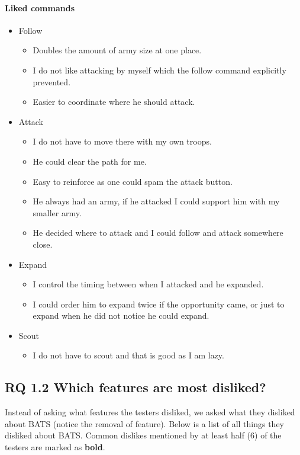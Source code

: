 \paragraph{Liked commands}
\begin{itemize}
	\item Follow
	\begin{itemize}
		\item Doubles the amount of army size at one place.
		\item I do not like attacking by myself which the follow command explicitly prevented.
		\item Easier to coordinate where he should attack.
	\end{itemize}
	\item Attack
	\begin{itemize}
		\item I do not have to move there with my own troops.
		\item He could clear the path for me.
		\item Easy to reinforce as one could spam the attack button.
		\item He always had an army, if he attacked I could support him with my smaller army.
		\item He decided where to attack and I could follow and attack somewhere close.
	\end{itemize}
	\item Expand
	\begin{itemize}
		\item I control the timing between when I attacked and he expanded.
		\item I could order him to expand twice if the opportunity came, or just to expand when he did not notice he could expand.
	\end{itemize}
	\item Scout
	\begin{itemize}
		\item I do not have to scout and that is good as I am lazy.
	\end{itemize}
\end{itemize}

\subsection{RQ 1.2 Which features are most disliked?}
Instead of asking what features the testers disliked, we asked what they disliked about BATS (notice the removal of feature). Below is a list of all things they disliked about BATS. Common dislikes mentioned by at least half (6) of the testers are marked as \textbf{bold}.

